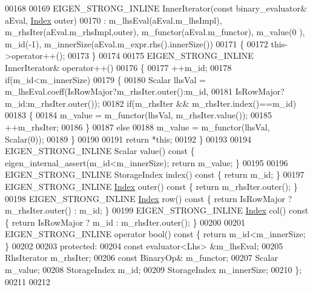 \begin{DoxyCode}
00168 
00169     EIGEN\_STRONG\_INLINE InnerIterator(\textcolor{keyword}{const} binary\_evaluator& aEval, \hyperlink{namespace_eigen_a62e77e0933482dafde8fe197d9a2cfde}{Index} outer)
00170       : m\_lhsEval(aEval.m\_lhsImpl), m\_rhsIter(aEval.m\_rhsImpl,outer), m\_functor(aEval.m\_functor), m\_value(0
      ), m\_id(-1), m\_innerSize(aEval.m\_expr.rhs().innerSize())
00171     \{
00172       this->operator++();
00173     \}
00174 
00175     EIGEN\_STRONG\_INLINE InnerIterator& operator++()
00176     \{
00177       ++m\_id;
00178       \textcolor{keywordflow}{if}(m\_id<m\_innerSize)
00179       \{
00180         Scalar lhsVal = m\_lhsEval.coeff(IsRowMajor?m\_rhsIter.outer():m\_id,
00181                                         IsRowMajor?m\_id:m\_rhsIter.outer());
00182         \textcolor{keywordflow}{if}(m\_rhsIter && m\_rhsIter.index()==m\_id)
00183         \{
00184           m\_value = m\_functor(lhsVal, m\_rhsIter.value());
00185           ++m\_rhsIter;
00186         \}
00187         \textcolor{keywordflow}{else}
00188           m\_value = m\_functor(lhsVal, Scalar(0));
00189       \}
00190 
00191       \textcolor{keywordflow}{return} *\textcolor{keyword}{this};
00192     \}
00193 
00194     EIGEN\_STRONG\_INLINE Scalar value()\textcolor{keyword}{ const }\{ eigen\_internal\_assert(m\_id<m\_innerSize); \textcolor{keywordflow}{return} m\_value; \}
00195 
00196     EIGEN\_STRONG\_INLINE StorageIndex index()\textcolor{keyword}{ const }\{ \textcolor{keywordflow}{return} m\_id; \}
00197     EIGEN\_STRONG\_INLINE \hyperlink{namespace_eigen_a62e77e0933482dafde8fe197d9a2cfde}{Index} outer()\textcolor{keyword}{ const }\{ \textcolor{keywordflow}{return} m\_rhsIter.outer(); \}
00198     EIGEN\_STRONG\_INLINE \hyperlink{namespace_eigen_a62e77e0933482dafde8fe197d9a2cfde}{Index} row()\textcolor{keyword}{ const }\{ \textcolor{keywordflow}{return} IsRowMajor ? m\_rhsIter.outer() : m\_id; \}
00199     EIGEN\_STRONG\_INLINE \hyperlink{namespace_eigen_a62e77e0933482dafde8fe197d9a2cfde}{Index} col()\textcolor{keyword}{ const }\{ \textcolor{keywordflow}{return} IsRowMajor ? m\_id : m\_rhsIter.outer(); \}
00200 
00201     EIGEN\_STRONG\_INLINE \textcolor{keyword}{operator} bool()\textcolor{keyword}{ const }\{ \textcolor{keywordflow}{return} m\_id<m\_innerSize; \}
00202 
00203   \textcolor{keyword}{protected}:
00204     \textcolor{keyword}{const} evaluator<Lhs> &m\_lhsEval;
00205     RhsIterator m\_rhsIter;
00206     \textcolor{keyword}{const} BinaryOp& m\_functor;
00207     Scalar m\_value;
00208     StorageIndex m\_id;
00209     StorageIndex m\_innerSize;
00210   \};
00211 
00212 

\end{DoxyCode}
